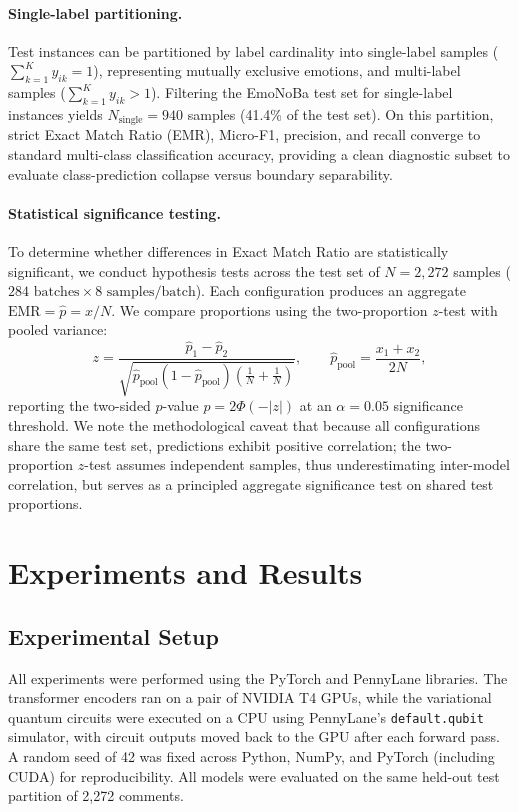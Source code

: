 \documentclass[runningheads]{llncs}
\begin{document}
\paragraph{Single-label partitioning.} Test instances can be partitioned by label cardinality into single-label samples ($\sum_{k=1}^K y_{ik} = 1$), representing mutually exclusive emotions, and multi-label samples ($\sum_{k=1}^K y_{ik} > 1$). Filtering the EmoNoBa test set for single-label instances yields $N_{\text{single}} = 940$ samples (41.4\% of the test set). On this partition, strict Exact Match Ratio (EMR), Micro-F1, precision, and recall converge to standard multi-class classification accuracy, providing a clean diagnostic subset to evaluate class-prediction collapse versus boundary separability.

\paragraph{Statistical significance testing.} To determine whether differences in Exact Match Ratio are statistically significant, we conduct hypothesis tests across the test set of $N = 2{,}272$ samples ($284\text{ batches} \times 8\text{ samples/batch}$). Each configuration produces an aggregate $\text{EMR} = \hat{p} = x / N$. We compare proportions using the two-proportion $z$-test with pooled variance:
\begin{equation}
z = \frac{\hat{p}_1 - \hat{p}_2}{\sqrt{\hat{p}_{\text{pool}}(1 - \hat{p}_{\text{pool}})\left(\frac{1}{N} + \frac{1}{N}\right)}}, \qquad \hat{p}_{\text{pool}} = \frac{x_1 + x_2}{2N},
\label{eq:ztest}
\end{equation}
reporting the two-sided $p$-value $p = 2\Phi(-|z|)$ at an $\alpha = 0.05$ significance threshold. We note the methodological caveat that because all configurations share the same test set, predictions exhibit positive correlation; the two-proportion $z$-test assumes independent samples, thus underestimating inter-model correlation, but serves as a principled aggregate significance test on shared test proportions.

\section{Experiments and Results}\label{sec:experiments}

\subsection{Experimental Setup}\label{sec:setup}
All experiments were performed using the PyTorch and PennyLane libraries. The transformer encoders ran on a pair of NVIDIA T4 GPUs, while the variational quantum circuits were executed on a CPU using PennyLane's \texttt{default.qubit} simulator, with circuit outputs moved back to the GPU after each forward pass. A random seed of 42 was fixed across Python, NumPy, and PyTorch (including CUDA) for reproducibility. All models were evaluated on the same held-out test partition of 2,272 comments. 
\end{document}
